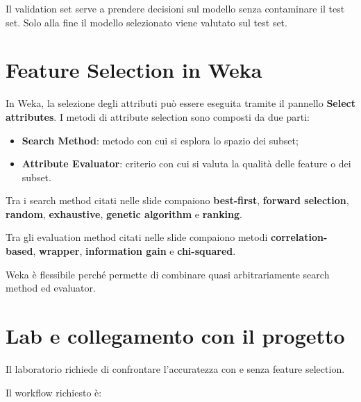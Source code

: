 Il validation set serve a prendere decisioni sul modello senza contaminare il test set. Solo alla fine il modello selezionato viene valutato sul test set.

\section{Feature Selection in Weka}

In Weka, la selezione degli attributi può essere eseguita tramite il pannello \textbf{Select attributes}. I metodi di attribute selection sono composti da due parti:

\begin{itemize}
    \item \textbf{Search Method}: metodo con cui si esplora lo spazio dei subset;
    \item \textbf{Attribute Evaluator}: criterio con cui si valuta la qualità delle feature o dei subset.
\end{itemize}

\begin{notaslide}
Tra i search method citati nelle slide compaiono \textbf{best-first}, \textbf{forward selection}, \textbf{random}, \textbf{exhaustive}, \textbf{genetic algorithm} e \textbf{ranking}.
\end{notaslide}

\begin{notaslide}
Tra gli evaluation method citati nelle slide compaiono metodi \textbf{correlation-based}, \textbf{wrapper}, \textbf{information gain} e \textbf{chi-squared}.
\end{notaslide}

\begin{notaprof}
Weka è flessibile perché permette di combinare quasi arbitrariamente search method ed evaluator.
\end{notaprof}

\section{Lab e collegamento con il progetto}

Il laboratorio richiede di confrontare l'accuratezza con e senza feature selection.

Il workflow richiesto è:


